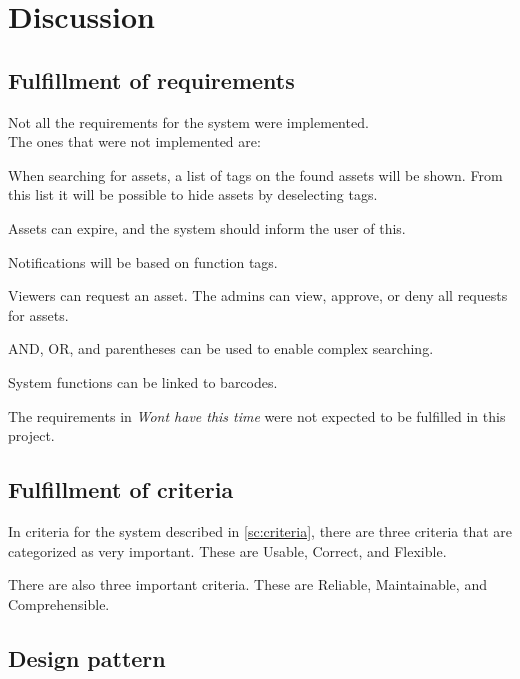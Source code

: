 \chapter{Discussion}\label{ch:discussion}

\section{Fulfillment of requirements}

Not all the requirements for the system were implemented. 
\\
The ones that were not implemented are:
\par
When searching for assets, a list of tags on the found assets will be shown. From this list it will be possible to hide assets by deselecting tags. 
\par
Assets can expire, and the system should inform the user of this.
\par
Notifications will be based on function tags.
\par
Viewers can request an asset. The admins can view, approve, or deny all requests for assets.
\par
AND, OR, and parentheses can be used to enable complex searching. %
\par
System functions can be linked to barcodes.

\par
The requirements in \textit{Wont have this time} were not expected to be fulfilled in this project. 

\section{Fulfillment of criteria}
In criteria for the system described in \autoref{sc:criteria}, there are three criteria that are categorized as very important. These are Usable, Correct, and Flexible.
\par
There are also three important criteria. These are Reliable, Maintainable, and Comprehensible.

\section{Design pattern}


